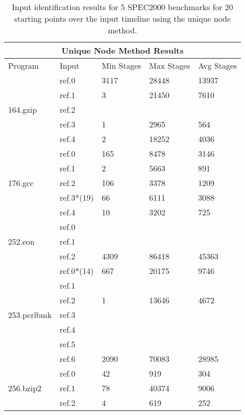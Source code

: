 \begin{table}[t!]
\center
\begin{tabular}{|l|l|l|l|l|}
\hline
\multicolumn{5}{|c|}{Unique Node Method Results}\\
\hline
Program&Input&Min Stages&Max Stages&Avg Stages\\
\hline\hline
\multirow{5}{*}{164.gzip}
    &ref.0&3117&28448&13937\\
    &ref.1&3&21450&7610\\
    &ref.2&&&\\
    &ref.3&1&2965&564\\
    &ref.4&2&18252&4036\\
\hline\hline
\multirow{5}{*}{176.gcc}
    &ref.0&165&8478&3146\\
    &ref.1&2&5663&891\\
    &ref.2&106&3378&1209\\
    &ref.3*(19)&66&6111&3088\\
    &ref.4&10&3202&725\\
\hline\hline
\multirow{3}{*}{252.eon}
    &ref.0&&&\\
    &ref.1&&&\\
    &ref.2&4309&86418&45363\\
\hline\hline
\multirow{7}{*}{253.perlbmk}
    &ref.0*(14)&667&20175&9746\\
    &ref.1&&&\\
    &ref.2&1&13646&4672\\
    &ref.3&&&\\
    &ref.4&&&\\
    &ref.5&&&\\
    &ref.6&2090&70083&28985\\
\hline\hline
\multirow{3}{*}{256.bzip2}
    &ref.0&42&919&304\\
    &ref.1&78&40374&9006\\
    &ref.2&4&619&252\\
\hline
\end{tabular}
\caption{Input identification results for 5 SPEC2000 benchmarks for 20 starting
points over the input timeline using the unique node method.}
\label{table:input_id_node_results}
\end{table}

